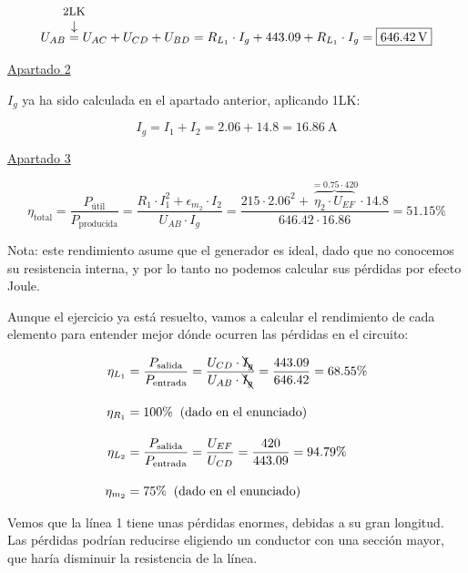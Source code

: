 \begin{example}
\begin{itemize}
        \vspace{-9mm}
        \[
            U_{AB} \overarrow[=][\downarrow]{\small 2LK}  U_{AC} + U_{CD} + U_{BD} = R_{L_1}\cdot I_g + 443.09 + R_{L_1}\cdot I_g = \boxed{ \qty{646.42}{\volt} }
        \]
        
    \end{itemize}
    
    
    \vspace{2mm}
    
    \underline{Apartado 2}
    
    \vspace{4mm}
    
    $I_g$ ya ha sido calculada en el apartado anterior, aplicando 1LK:
    
    \[
        I_g = I_1 + I_2 = 2.06 + 14.8 = \boxed{ \qty{16.86}{\ampere} }
    \]
    
    \vspace{2mm}
    
    \underline{Apartado 3}
    
    \vspace{-3mm}
    
    \[
        \eta_{\textrm{total}} = \frac{P_{\textrm{útil}}}{P_{\textrm{producida}}} = \frac{R_1\cdot I_1^2 + \epsilon_{m_2} \cdot I_2}{U_{AB} \cdot I_g} = \frac{215 \cdot 2.06^2 + \overbrace{\eta_2 \cdot U_{EF}}^{=0.75\cdot 420} \cdot 14.8}{646.42 \cdot 16.86} = \boxed{51.15\%}
    \]
    
    Nota: este rendimiento asume que el generador es ideal, dado que no conocemos su resistencia interna, y por lo tanto no podemos calcular sus pérdidas por efecto Joule.

    \vspace{2mm}
    Aunque el ejercicio ya está resuelto, vamos a calcular el rendimiento de cada elemento para entender mejor dónde ocurren las pérdidas en el circuito:

    \vspace{-3mm}
    \begin{align*}
        \eta_{L_1} &= \frac{P_{\textrm{salida}}}{P_{\textrm{entrada}}} = \frac{U_{CD}\cdot \bcancel{I_g}}{U_{AB} \cdot \bcancel{I_g}} = \frac{443.09}{646.42} = 68.55\%\\[10pt]
        \eta_{R_1} &= 100\% \;\; \text{(dado en el enunciado)}\\[10pt]
        \eta_{L_2} &= \frac{P_{\textrm{salida}}}{P_{\textrm{entrada}}} = \frac{U_{EF}}{U_{CD}} = \frac{420}{443.09} = 94.79\%\\[10pt]
        \eta_{m_2} &= 75\% \;\; \text{(dado en el enunciado)}  
    \end{align*}
    
    Vemos que la línea 1 tiene unas pérdidas enormes, debidas a su gran longitud. Las pérdidas podrían reducirse eligiendo un conductor con una sección mayor, que haría disminuir la resistencia de la línea.

\end{example}


